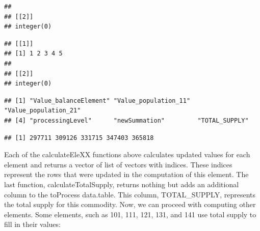 \documentclass[nojss]{jss}
\begin{document}
\begin{knitrout}
\begin{kframe}
\begin{verbatim}
## 
## [[2]]
## integer(0)
\end{verbatim}
\begin{alltt}
\hlstd{(}   
\end{alltt}
\begin{verbatim}
## [[1]]
## [1] 1 2 3 4 5
## 
## [[2]]
## integer(0)
\end{verbatim}
\begin{alltt}
\hlstd{(}   
\hlstd{(}
\end{alltt}
\begin{verbatim}
## [1] "Value_balanceElement" "Value_population_11"  "Value_population_21" 
## [4] "processingLevel"      "newSummation"         "TOTAL_SUPPLY"
\end{verbatim}
\begin{alltt}
\hlopt{$}
\end{alltt}
\begin{verbatim}
## [1] 297711 309126 331715 347403 365818
\end{verbatim}
\end{kframe}
\end{knitrout}

Each of the calculateEleXX functions above calculates updated values for each
element and returns a vector of list of vectors with indices.  These indices
represent the rows that were updated in the computation of this element.  The
last function, calculateTotalSupply, returns nothing but adds an additional
column to the toProcess data.table.  This column, TOTAL\_SUPPLY, represents the
total supply for this commodity.  Now, we can proceed with computing other
elements.  Some elements, such as 101, 111, 121, 131, and 141 use total supply
to fill in their values:
\end{document}
